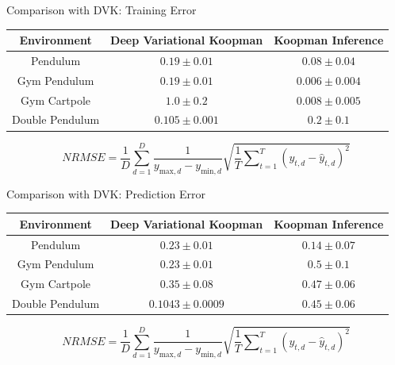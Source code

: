 \documentclass[
	aspectratio=43,
	color={accentcolor=1c},
	logo=false,
	colorframetitle=true,
	handout
]{tudabeamer}
\begin{document}
			\begin{frame}[c]{Comparison with DVK: Training Error}
				\begin{table}
					\centering
					\begin{tabular}{c|c|c}
						\textbf{Environment} & \textbf{Deep Variational Koopman} & \textbf{Koopman Inference} \\ \hline
						      Pendulum       &         \(0.19 \pm 0.01\)         &   \(\bm{0.08 \pm 0.04}\)   \\
						    Gym Pendulum     &         \(0.19 \pm 0.01\)         &  \(\bm{0.006 \pm 0.004}\)  \\
						    Gym Cartpole     &          \(1.0 \pm 0.2\)          &  \(\bm{0.008 \pm 0.005}\)  \\
						  Double Pendulum    &     \(\bm{0.105 \pm 0.001}\)      &      \(0.2 \pm 0.1\)
					\end{tabular}
				\end{table}

				\vspace{0.5cm}
				\begin{equation*}
					\mathit{NRMSE} = \frac{1}{D} \sum_{d = 1}^{D} \frac{1}{y_{\mathrm{max}, d} - y_{\mathrm{min}, d}} \sqrt{\frac{1}{T} \sum\nolimits_{t = 1}^{T} (y_{t, d} - \hat{y}_{t, d})^2}
				\end{equation*}
			\end{frame}

			\begin{frame}[c]{Comparison with DVK: Prediction Error}
				\begin{table}
					\centering
					\begin{tabular}{c|c|c}
						\textbf{Environment} & \textbf{Deep Variational Koopman} & \textbf{Koopman Inference} \\ \hline
						      Pendulum       &         \(0.23 \pm 0.01\)         &   \(\bm{0.14 \pm 0.07}\)   \\
						    Gym Pendulum     &      \(\bm{0.23 \pm 0.01}\)       &      \(0.5 \pm 0.1\)       \\
						    Gym Cartpole     &      \(\bm{0.35 \pm 0.08}\)       &     \(0.47 \pm 0.06\)      \\
						  Double Pendulum    &    \(\bm{0.1043 \pm 0.0009}\)     &     \(0.45 \pm 0.06\)
					\end{tabular}
				\end{table}

				\vspace{0.5cm}
				\begin{equation*}
					\mathit{NRMSE} = \frac{1}{D} \sum_{d = 1}^{D} \frac{1}{y_{\mathrm{max}, d} - y_{\mathrm{min}, d}} \sqrt{\frac{1}{T} \sum\nolimits_{t = 1}^{T} (y_{t, d} - \hat{y}_{t, d})^2}
				\end{equation*}
			\end{frame}
\end{document}
